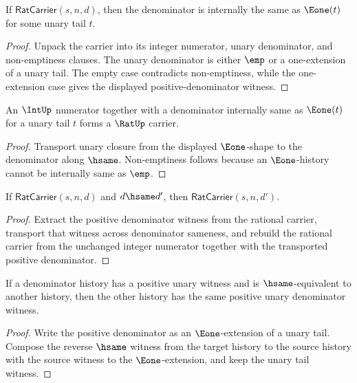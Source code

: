 \begin{theorem}
\label{thm:rat-carrier-positive-denominator}
If $\mathsf{RatCarrier}(s,n,d)$, then the denominator is internally the same as $\Eone(t)$ for some unary tail $t$.
\end{theorem}
\begin{proof}
Unpack the carrier into its integer numerator, unary denominator, and non-emptiness clauses. The unary denominator is either $\emp$ or a one-extension of a unary tail. The empty case contradicts non-emptiness, while the one-extension case gives the displayed positive-denominator witness.
\end{proof}

\begin{theorem}
\label{thm:rat-carrier-from-positive-denominator}
An $\IntUp$ numerator together with a denominator internally same as
$\Eone(t)$ for a unary tail $t$ forms a $\RatUp$ carrier.
\end{theorem}
\begin{proof}
Transport unary closure from the displayed $\Eone$-shape to the denominator
along $\hsame$. Non-emptiness follows because an $\Eone$-history cannot be
internally same as $\emp$.
\end{proof}

\begin{theorem}
\label{thm:rat-carrier-denominator-hsame-transport}
If $\mathsf{RatCarrier}(s,n,d)$ and $d\hsame d'$, then
$\mathsf{RatCarrier}(s,n,d')$.
\end{theorem}
\begin{proof}
Extract the positive denominator witness from the rational carrier, transport
that witness across denominator sameness, and rebuild the rational carrier from
the unchanged integer numerator together with the transported positive
denominator.
\end{proof}

\begin{theorem}
\label{thm:rat-positive-unary-denominator-hsame-transport}
If a denominator history has a positive unary witness and is $\hsame$-equivalent to another history, then the other history has the same positive unary denominator witness.
\end{theorem}
\begin{proof}
Write the positive denominator as an $\Eone$-extension of a unary tail. Compose the reverse $\hsame$ witness from the target history to the source history with the source witness to the $\Eone$-extension, and keep the unary tail witness.
\end{proof}

